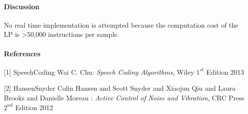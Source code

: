 \documentclass[a4paper]{article}
\begin{document}
	\paragraph{Discussion}
	 No real time implementation is attempted because the computation cost of the LP is >50,000 instructions per sample.
	
	
	\paragraph{References}
	\begin{description}
		\item{[1]}		{SpeechCoding} Wai C. Chu: \emph{Speech Coding Algorithms}, Wiley $1^{st}$ Edition 2013
		\item{[2]}		{HansenSnyder} Colin Hansen and Scott Snyder and Xiaojun Qiu and Laura Brooks and Danielle Moreau  : \emph{Active Control of Noise and Vibration}, CRC Press $2^{nd}$ Edition 2012
	\end{description}
\end{document}
